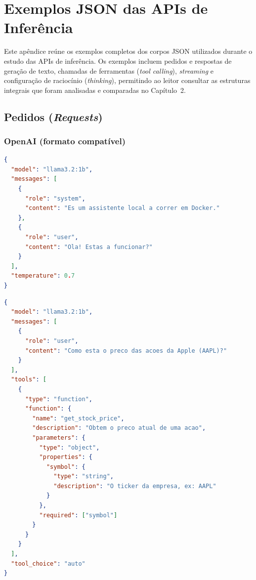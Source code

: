 \chapter{Exemplos JSON das APIs de Inferência}
\label{apx:json-apis}

Este apêndice reúne os exemplos completos dos corpos JSON utilizados durante o estudo das APIs de inferência. Os exemplos incluem pedidos e respostas de geração de texto, chamadas de ferramentas (\textit{tool calling}), \textit{streaming} e configuração de raciocínio (\textit{thinking}), permitindo ao leitor consultar as estruturas integrais que foram analisadas e comparadas no Capítulo~2.

\section{Pedidos (\textit{Requests})}
\label{apx:json-requests}

\subsection{\textbf{OpenAI} (formato compatível)}

\begin{lstlisting}[language=json, caption={Pedido básico à API da \textbf{OpenAI} (geração com \textit{system prompt})}]
{
  "model": "llama3.2:1b",
  "messages": [
    {
      "role": "system",
      "content": "Es um assistente local a correr em Docker."
    },
    {
      "role": "user",
      "content": "Ola! Estas a funcionar?"
    }
  ],
  "temperature": 0.7
}
\end{lstlisting}

\begin{lstlisting}[language=json, caption={Pedido à API da \textbf{OpenAI} com ferramentas (\textit{tool calling})}]
{
  "model": "llama3.2:1b",
  "messages": [
    {
      "role": "user",
      "content": "Como esta o preco das acoes da Apple (AAPL)?"
    }
  ],
  "tools": [
    {
      "type": "function",
      "function": {
        "name": "get_stock_price",
        "description": "Obtem o preco atual de uma acao",
        "parameters": {
          "type": "object",
          "properties": {
            "symbol": {
              "type": "string",
              "description": "O ticker da empresa, ex: AAPL"
            }
          },
          "required": ["symbol"]
        }
      }
    }
  ],
  "tool_choice": "auto"
}
\end{lstlisting}

